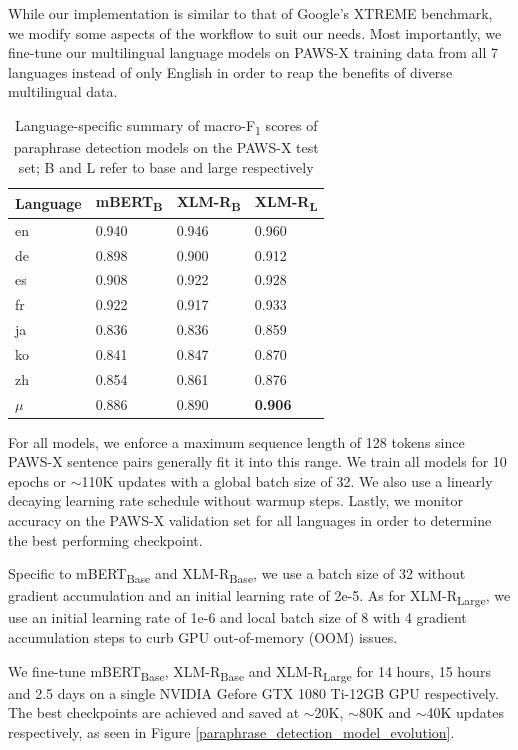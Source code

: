 \documentclass[11pt,a4paper]{article}
\begin{document}
While our implementation is similar to that of Google's XTREME benchmark, we modify some aspects of the workflow to suit our needs. Most importantly, we fine-tune our multilingual language models on PAWS-X training data from all 7 languages instead of only English in order to reap the benefits of diverse multilingual data.

\begin{table}
  \centering
  \begin{tabular}{llll}
    \hline
    \textbf{Language} & \textbf{mBERT\textsubscript{B}} & \textbf{XLM-R\textsubscript{B}} & \textbf{XLM-R\textsubscript{L}} \\
    \hline
    en & 0.940 & 0.946 & 0.960 \\
    de & 0.898 & 0.900 & 0.912 \\
    es & 0.908 & 0.922 & 0.928 \\
    fr & 0.922 & 0.917 & 0.933 \\
    ja & 0.836 & 0.836 & 0.859 \\
    ko & 0.841 & 0.847 & 0.870 \\
    zh & 0.854 & 0.861 & 0.876 \\
    \hline \hline
    $\mu$ & 0.886 & 0.890 & \textbf{0.906} \\
    \hline
  \end{tabular} 
  \caption{Language-specific summary of macro-F\textsubscript{1} scores of paraphrase detection models on the PAWS-X test set; B and L refer to base and large respectively}
  \label{pawsx_score_breakdown}
\end{table}

For all models, we enforce a maximum sequence length of 128 tokens since PAWS-X sentence pairs generally fit it into this range. We train all models for 10 epochs or $\sim$110K updates with a global batch size of 32. We also use a linearly decaying learning rate schedule without warmup steps. Lastly, we monitor accuracy on the PAWS-X validation set for all languages in order to determine the best performing checkpoint.

Specific to mBERT\textsubscript{Base} and XLM-R\textsubscript{Base}, we use a batch size of 32 without gradient accumulation and an initial learning rate of 2e-5. As for XLM-R\textsubscript{Large}, we use an initial learning rate of 1e-6 and local batch size of 8 with 4 gradient accumulation steps to curb GPU out-of-memory (OOM) issues.

We fine-tune mBERT\textsubscript{Base}, XLM-R\textsubscript{Base} and XLM-R\textsubscript{Large} for 14 hours, 15 hours and 2.5 days on a single NVIDIA Gefore GTX 1080 Ti-12GB GPU respectively. The best checkpoints are achieved and saved at $\sim$20K, $\sim$80K and $\sim$40K updates respectively, as seen in Figure \ref{paraphrase_detection_model_evolution}.
\end{document}
